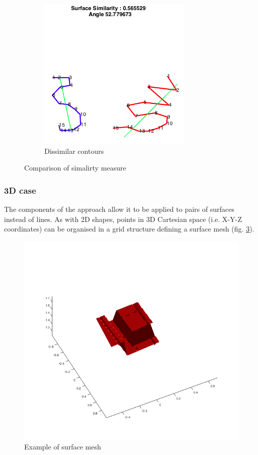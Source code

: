 \documentclass[
    floatsintext
]{article}
\begin{document}
\begin{figure}[h]
\begin{subfigure}{.44\textwidth}
    \includegraphics[width=1\linewidth]{./figures/no_correlation_2D.png}
    \caption{Dissimilar contours}
    \label{fig:no_correlation_2D}
  \end{subfigure}
  \caption{Comparison of simalirty measure}
\end{figure}

\pagebreak[2]
\subsubsection{3D case}

The components of the approach allow it to be applied to pairs of surfaces instead of lines. 
As with 2D shapes, points in 3D Cartesian space (i.e. X-Y-Z coordinates) can be organised in a grid structure defining a surface mesh (fig. \ref{fig:mesh_example}).

\begin{figure}[h]
  \centering
  \includegraphics[width=.5\textwidth]{./figures/mesh_example.png}
  \caption{Example of surface mesh}
  \label{fig:mesh_example}
\end{figure}  
\end{document}
